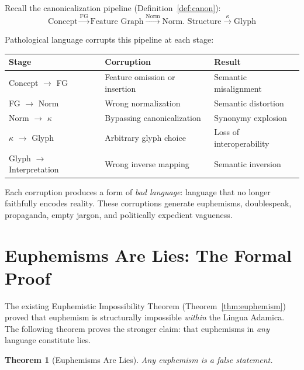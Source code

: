 \documentclass[12pt, letterpaper]{book}
\newtheorem{theorem}{Theorem}[chapter]
\begin{document}
Recall the canonicalization pipeline (Definition~\ref{def:canon}):
\[
\text{Concept} \xrightarrow{\mathrm{FG}} \text{Feature Graph} \xrightarrow{\mathrm{Norm}} \text{Norm. Structure} \xrightarrow{\kappa} \text{Glyph}
\]

Pathological language corrupts this pipeline at each stage:

\begin{center}
\begin{tabular}{llp{5cm}}
\toprule
\textbf{Stage} & \textbf{Corruption} & \textbf{Result} \\
\midrule
Concept $\to$ FG & Feature omission or insertion & Semantic misalignment \\
FG $\to$ Norm & Wrong normalization & Semantic distortion \\
Norm $\to$ $\kappa$ & Bypassing canonicalization & Synonymy explosion \\
$\kappa$ $\to$ Glyph & Arbitrary glyph choice & Loss of interoperability \\
Glyph $\to$ Interpretation & Wrong inverse mapping & Semantic inversion \\
\bottomrule
\end{tabular}
\end{center}

Each corruption produces a form of \textit{bad language}: language that no longer faithfully encodes reality. These corruptions generate euphemisms, doublespeak, propaganda, empty jargon, and politically expedient vagueness.

\section{Euphemisms Are Lies: The Formal Proof}

The existing Euphemistic Impossibility Theorem (Theorem~\ref{thm:euphemism}) proved that euphemism is structurally impossible \textit{within} the Lingua Adamica. The following theorem proves the stronger claim: that euphemisms in \textit{any} language constitute lies.

\begin{theorem}[Euphemisms Are Lies]\label{thm:euphemism-lies}
Any euphemism is a false statement.
\end{theorem}
\end{document}
